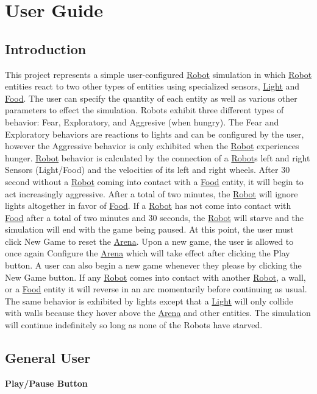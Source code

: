 \hypertarget{index_intro_sec}{}\section{User Guide}\label{index_intro_sec}
  \hypertarget{index_introduction}{}\subsection{Introduction}\label{index_introduction}
This project represents a simple user-\/configured \hyperlink{classRobot}{Robot} simulation in which \hyperlink{classRobot}{Robot} entities react to two other types of entities using specialized sensors, \hyperlink{classLight}{Light} and \hyperlink{classFood}{Food}. The user can specify the quantity of each entity as well as various other parameters to effect the simulation. Robots exhibit three different types of behavior\+: Fear, Exploratory, and Aggresive (when hungry). The Fear and Exploratory behaviors are reactions to lights and can be configured by the user, however the Aggressive behavior is only exhibited when the \hyperlink{classRobot}{Robot} experiences hunger. \hyperlink{classRobot}{Robot} behavior is calculated by the connection of a \hyperlink{classRobot}{Robot}\textquotesingle{}s left and right Sensors (Light/\+Food) and the velocities of its left and right wheels. After 30 second without a \hyperlink{classRobot}{Robot} coming into contact with a \hyperlink{classFood}{Food} entity, it will begin to act increasingly aggressive. After a total of two minutes, the \hyperlink{classRobot}{Robot} will ignore lights altogether in favor of \hyperlink{classFood}{Food}. If a \hyperlink{classRobot}{Robot} has not come into contact with \hyperlink{classFood}{Food} after a total of two minutes and 30 seconds, the \hyperlink{classRobot}{Robot} will starve and the simulation will end with the game being paused. At this point, the user must click New Game to reset the \hyperlink{classArena}{Arena}. Upon a new game, the user is allowed to once again Configure the \hyperlink{classArena}{Arena} which will take effect after clicking the Play button. A user can also begin a new game whenever they please by clicking the New Game button. If any \hyperlink{classRobot}{Robot} comes into contact with another \hyperlink{classRobot}{Robot}, a wall, or a \hyperlink{classFood}{Food} entity it will reverse in an arc momentarily before continuing as usual. The same behavior is exhibited by lights except that a \hyperlink{classLight}{Light} will only collide with walls because they hover above the \hyperlink{classArena}{Arena} and other entities. The simulation will continue indefinitely so long as none of the Robots have starved.\hypertarget{index_non_technical}{}\subsection{General User}\label{index_non_technical}
{\bfseries Play/\+Pause Button}

